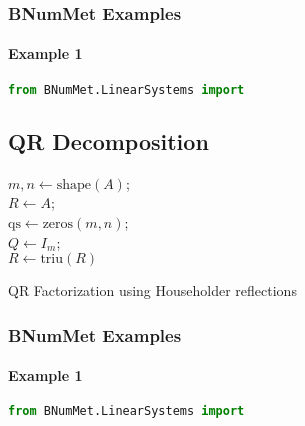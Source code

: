 \subsubsection{BNumMet Examples}
\paragraph{Example 1}{
\begin{lstlisting}[language=Python]
from BNumMet.LinearSystems import 

\end{lstlisting}
}

\subsection{QR Decomposition}
\begin{algorithm}[H]{
\SetAlgoLined
{}
$m, n \gets \text{shape}(A)$;\\
$R \gets A$;\\
$\text{qs} \gets \text{zeros}(m, n)$;\\
\For{$k \in [0, n)$}{
    $x \gets R_{k:, k}$;\\
    $q_k \gets \text{sign}(x_0) \times \text{norm}(x) \times I_{x, 1} + x$;\\
    $q_k \gets q_k / \text{norm}(q_k)$; \\
    $R_{k:, k:} \gets R_{k:, k:} - 2q_k(q_k^TR_{k:, k:})$ ;\\
}
$ Q \gets I_m $;\\
$R \gets \text{triu}(R)$\;
\;
}
\caption{QR Factorization using Householder reflections}
\end{algorithm}
\subsubsection{BNumMet Examples}
\paragraph{Example 1}{
\begin{lstlisting}[language=Python]
from BNumMet.LinearSystems import 

\end{lstlisting}
}

